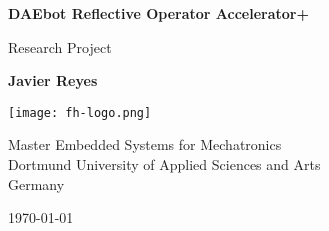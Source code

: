 \begin{titlepage}
  \begin{center}
    \vspace*{2cm}

    \Huge
    \textbf{DAEbot Reflective Operator Accelerator+}

    \vspace{1cm}

    \LARGE
    {Research Project}

    \vspace{3cm}

    \textbf{Javier Reyes}

    \vfill

    \vspace{2cm}

    \texttt{[image: fh-logo.png]}

    \vspace{2cm}

    \Large
    {Master Embedded Systems for Mechatronics\\
    Dortmund University of Applied Sciences and Arts\\
    Germany}

    \vspace{0.5cm}

    \large
    {\today}

  \end{center}
\end{titlepage}
